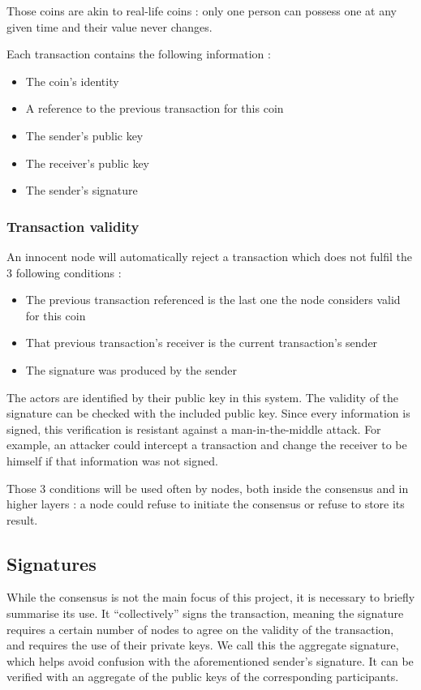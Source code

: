\documentclass[11pt, a4paper, twoside, openright]{article}
\begin{document}
Those coins are akin to real-life coins : only one person can possess one at any given time and their value never changes.

Each transaction contains the following information :
\begin{itemize}
\itemsep0em
\item The coin's identity
\item A reference to the previous transaction for this coin
\item The sender's public key
\item The receiver's public key
\item The sender's signature
\end{itemize}

\subsubsection{Transaction validity}

An innocent node will automatically reject a transaction which does not fulfil the 3 following conditions :

\begin{itemize}
\itemsep0em
\item The previous transaction referenced is the last one the node considers valid for this coin
\item That previous transaction's receiver is the current transaction's sender
\item The signature was produced by the sender
\end{itemize}

The actors are identified by their public key in this system. The validity of the signature can be checked with the included public key. Since every information is signed, this verification is resistant against a man-in-the-middle attack. For example, an attacker could intercept a transaction and change the receiver to be himself if that information was not signed.

Those 3 conditions will be used often by nodes, both inside the consensus and in higher layers : a node could refuse to initiate the consensus or refuse to store its result.

\subsection{Signatures}

While the consensus is not the main focus of this project, it is necessary to briefly summarise its use. It ``collectively'' signs the transaction, meaning the signature requires a certain number of nodes to agree on the validity of the transaction, and requires the use of their private keys. We call this the aggregate signature, which helps avoid confusion with the aforementioned sender's signature. It can be verified with an aggregate of the public keys of the corresponding participants.
\end{document}
